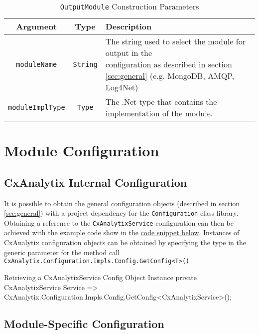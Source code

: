 \begin{table}
    \centering
    \begin{tabular}{|c|c|l|}
        \toprule
        \textbf{Argument} & \textbf{Type} & \textbf{Description}\\
        \midrule
        \texttt{moduleName} & \texttt{String} & \makecell[l]{The string used to select the module for output in the\\
        configuration as described in section \ref{sec:general} (e.g. MongoDB, AMQP, Log4Net)}\\
        \midrule
        \texttt{moduleImplType} & \texttt{Type} & The .Net type that contains the implementation of the module.\\
        \bottomrule
    \end{tabular}
    \caption{\texttt{OutputModule} Construction Parameters}
    \label{tab:output}
\end{table}


\section{Module Configuration}

\subsection{CxAnalytix Internal Configuration}\label{sec:internal_config}

It is possible to obtain the general configuration objects (described in section \ref{sec:general}) with a project dependency for the \texttt{Configuration}
class library.  Obtaining a reference to the \texttt{CxAnalytixService} configuration can then be achieved with the example code show in the 
\hyperref[lst:global_config]{code snippet below}.  Instances of CxAnalytix configuration objects can be obtained by specifying the type in the generic parameter for the 
method call \texttt{CxAnalytix.Configuration.Impls.Config.GetConfig<T>()} 


\begin{code}{Retrieving a CxAnalytixService Config Object Instance}{\label{lst:global_config}}{}
private CxAnalytixService Service => 
    CxAnalytix.Configuration.Impls.Config.GetConfig<CxAnalytixService>();
\end{code}


\subsection{Module-Specific Configuration}

